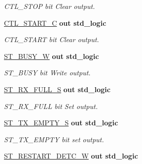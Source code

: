 \begin{DoxyCompactItemize}
\begin{DoxyCompactList}\small\item\em C\+T\+L\+\_\+\+S\+T\+OP bit Clear output. \end{DoxyCompactList}\item 
\hyperlink{classi2c__master__engine_a17d9807fb319897541f2d6b1707dc714}{C\+T\+L\+\_\+\+S\+T\+A\+R\+T\+\_\+C}  {\bfseries {\bfseries \textcolor{vhdlchar}{out}\textcolor{vhdlchar}{ }}} {\bfseries \textcolor{vhdlchar}{std\+\_\+logic}\textcolor{vhdlchar}{ }} 
\begin{DoxyCompactList}\small\item\em C\+T\+L\+\_\+\+S\+T\+A\+RT bit Clear output. \end{DoxyCompactList}\item 
\hyperlink{classi2c__master__engine_a555d445643d4a0c48d8963ea5e2d9dff}{S\+T\+\_\+\+B\+U\+S\+Y\+\_\+W}  {\bfseries {\bfseries \textcolor{vhdlchar}{out}\textcolor{vhdlchar}{ }}} {\bfseries \textcolor{vhdlchar}{std\+\_\+logic}\textcolor{vhdlchar}{ }} 
\begin{DoxyCompactList}\small\item\em S\+T\+\_\+\+B\+U\+SY bit Write output. \end{DoxyCompactList}\item 
\hyperlink{classi2c__master__engine_a35dfd0eb5f623ff4b3eaa92f1767968e}{S\+T\+\_\+\+R\+X\+\_\+\+F\+U\+L\+L\+\_\+S}  {\bfseries {\bfseries \textcolor{vhdlchar}{out}\textcolor{vhdlchar}{ }}} {\bfseries \textcolor{vhdlchar}{std\+\_\+logic}\textcolor{vhdlchar}{ }} 
\begin{DoxyCompactList}\small\item\em S\+T\+\_\+\+R\+X\+\_\+\+F\+U\+LL bit Set output. \end{DoxyCompactList}\item 
\hyperlink{classi2c__master__engine_af80eb88536f1e2191fd9191e99d242a5}{S\+T\+\_\+\+T\+X\+\_\+\+E\+M\+P\+T\+Y\+\_\+S}  {\bfseries {\bfseries \textcolor{vhdlchar}{out}\textcolor{vhdlchar}{ }}} {\bfseries \textcolor{vhdlchar}{std\+\_\+logic}\textcolor{vhdlchar}{ }} 
\begin{DoxyCompactList}\small\item\em S\+T\+\_\+\+T\+X\+\_\+\+E\+M\+P\+TY bit set output. \end{DoxyCompactList}\item 
\hyperlink{classi2c__master__engine_ac0a3b517da19738dbbb4ec7a5f83612d}{S\+T\+\_\+\+R\+E\+S\+T\+A\+R\+T\+\_\+\+D\+E\+T\+C\+\_\+W}  {\bfseries {\bfseries \textcolor{vhdlchar}{out}\textcolor{vhdlchar}{ }}} {\bfseries \textcolor{vhdlchar}{std\+\_\+logic}\textcolor{vhdlchar}{ }} 

\end{DoxyCompactItemize}
